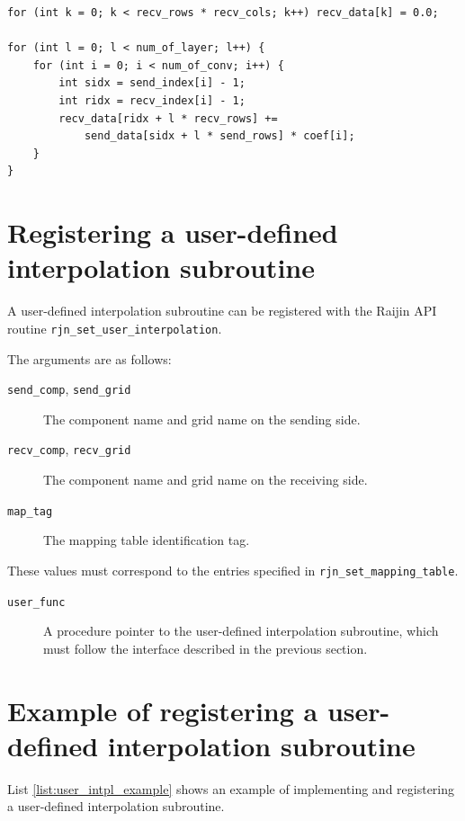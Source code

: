 \documentclass[11pt,a4paper]{report}
\newcommand{\lstref}[1]{List \ref{#1}}
\begin{document}
\begin{lstlisting}[caption=Example of a basic interpolation calculation,
                    label=list:example_interpolation_code]
for (int k = 0; k < recv_rows * recv_cols; k++) recv_data[k] = 0.0;

for (int l = 0; l < num_of_layer; l++) {
    for (int i = 0; i < num_of_conv; i++) {
        int sidx = send_index[i] - 1;
        int ridx = recv_index[i] - 1;
        recv_data[ridx + l * recv_rows] +=
            send_data[sidx + l * send_rows] * coef[i];
    }
}
\end{lstlisting}

\section{Registering a user-defined interpolation subroutine}

A user-defined interpolation subroutine
can be registered with the Raijin API routine
\texttt{rjn\_set\_user\_interpolation}.

The arguments are as follows:

\begin{description}
\item[\texttt{send\_comp}, \texttt{send\_grid}]
  The component name and grid name on the sending side.
\item[\texttt{recv\_comp}, \texttt{recv\_grid}]
  The component name and grid name on the receiving side.
\item[\texttt{map\_tag}]
  The mapping table identification tag.
\end{description}

These values must correspond to the entries
specified in \texttt{rjn\_set\_mapping\_table}.

\begin{description}
\item[\texttt{user\_func}]
  A procedure pointer to the user-defined
  interpolation subroutine,
  which must follow the interface
  described in the previous section.
\end{description}

\section{Example of registering a user-defined interpolation subroutine}

\lstref{list:user_intpl_example} shows an example
of implementing and registering
a user-defined interpolation subroutine.
\end{document}
